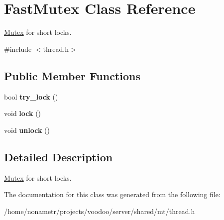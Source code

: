 \hypertarget{classFastMutex}{\section{\-Fast\-Mutex \-Class \-Reference}
\label{classFastMutex}
}


\hyperlink{classMutex}{\-Mutex} for short locks.  




{\ttfamily \#include $<$thread.\-h$>$}

\subsection*{\-Public \-Member \-Functions}
\begin{DoxyCompactItemize}
\item 
\hypertarget{classFastMutex_a317934d02531202e55bd185c67bcde41}{bool {\bfseries try\-\_\-lock} ()}\label{classFastMutex_a317934d02531202e55bd185c67bcde41}

\item 
\hypertarget{classFastMutex_a10491d65e4acbe17289fb5f67173ad28}{void {\bfseries lock} ()}\label{classFastMutex_a10491d65e4acbe17289fb5f67173ad28}

\item 
\hypertarget{classFastMutex_a46d22576d48f22227db079c1b45e2b48}{void {\bfseries unlock} ()}\label{classFastMutex_a46d22576d48f22227db079c1b45e2b48}

\end{DoxyCompactItemize}


\subsection{\-Detailed \-Description}
\hyperlink{classMutex}{\-Mutex} for short locks. 

\-The documentation for this class was generated from the following file\-:\begin{DoxyCompactItemize}
\item 
/home/nonametr/projects/voodoo/server/shared/mt/thread.\-h\end{DoxyCompactItemize}
